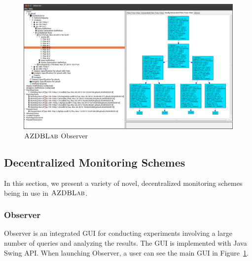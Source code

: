 \documentclass{vldb}
\def\azdb{\hbox{\sc AZDBLab}}
\begin{document}

\begin{figure}[htp!]
\centering
\includegraphics[scale=0.3]{./figures/observer_gui_new}
\caption{$\azdb$ Observer\label{fig:observer_gui}}
\vspace{-0.1in}
\end{figure}

\subsection{Decentralized Monitoring Schemes}
In this section, we present a variety of novel, decentralized monitoring schemes being in use in $\azdb$.

\subsubsection{Observer}\label{sec:observer}
Observer is an integrated \hbox{GUI} for \hbox{conducting} experiments involving a large number of queries and \hbox{analyzing} the \hbox{results}. 
The GUI is implemented with Java Swing API. When \linebreak \hbox{launching} \hbox{Observer}, a user can see the main \hbox{GUI} in \hbox{Figure}~\ref{fig:observer_gui}.

\end{document}
